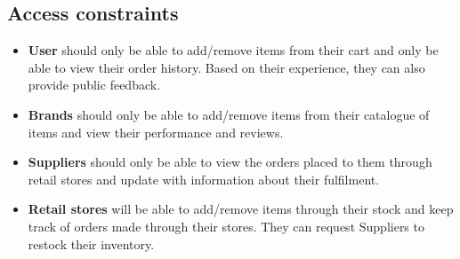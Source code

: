 \documentclass{article}
\begin{document}
\subsection{Access constraints}
\begin{itemize}
    \item \textbf{User} should only be able to add/remove items from their cart and only be able to view their order history. Based on their experience, they can also provide public feedback.
    \item \textbf{Brands} should only be able to add/remove items from their catalogue of items and view their performance and reviews.
    \item \textbf{Suppliers} should only be able to view the orders placed to them through retail stores and update with information about their fulfilment.
    \item \textbf{Retail stores} will be able to add/remove items through their stock and keep track of orders made through their stores. They can request Suppliers to restock their inventory.
\end{itemize}
\end{document}
